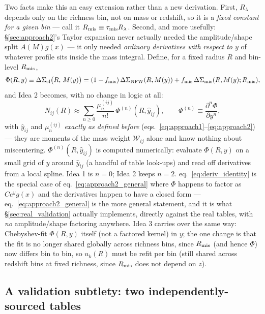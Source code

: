 \documentclass[a4paper, 11pt]{article}
\newcommand{\yeff}{\hat y}
\newcommand{\DSnfw}{\Delta\Sigma_{\rm NFW}}
\newcommand{\rmis}{R_{\rm mis}}
\newcommand{\Wcal}{\mathcal{W}}
\begin{document}
Two facts make this an easy extension rather than a new derivation.
First, $R_\lambda$ depends only on the richness bin, not on mass or
redshift, so it is a \emph{fixed constant for a given bin} --- call
it $\rmis \equiv \tau_{\rm mis}R_\lambda$. Second, and more usefully:
\S\ref{sec:approach2}'s Taylor expansion never actually needed the
amplitude/shape split $A(M)g(x)$ --- it only needed \emph{ordinary
derivatives with respect to $y$} of whatever profile sits inside the
mass integral. Define, for a fixed radius $R$ and bin-level $\rmis$,
\begin{equation}
\Phi(R,y) \equiv \Delta\Sigma_{\rm cl}\big(R,\,M(y)\big)
= (1-f_{\rm mis})\,\DSnfw(R,M(y)) + f_{\rm mis}\,\Delta\Sigma_{\rm mis}(R,M(y);\rmis),
\label{eq:Phi}
\end{equation}
and Idea 2 becomes, with no change in logic at all:
\begin{equation}
\boxed{\;
N_{ij}(R) \approx \sum_{n\ge0} \frac{\mu_n^{(ij)}}{n!}\,\Phi^{(n)}(R,\yeff_{ij}),
\qquad
\Phi^{(n)} \equiv \frac{\partial^n\Phi}{\partial y^n},
\;}
\label{eq:approach2_general}
\end{equation}
with $\yeff_{ij}$ and $\mu_n^{(ij)}$ \emph{exactly as defined before}
(eqs.~\ref{eq:approach1}--\ref{eq:approach2}) --- they are moments of
the mass weight $\Wcal_{ij}$ alone and know nothing about
miscentering. $\Phi^{(n)}(R,\yeff_{ij})$ is computed numerically:
evaluate $\Phi(R,y)$ on a small grid of $y$ around $\yeff_{ij}$ (a
handful of table look-ups) and read off derivatives from a local
spline. Idea 1 is $n=0$; Idea 2 keeps $n=2$. eq.~\eqref{eq:deriv_identity}
is the special case of eq.~\eqref{eq:approach2_general} where $\Phi$
happens to factor as $Ce^yg(x)$ and the derivatives happen to have a
closed form --- eq.~\eqref{eq:approach2_general} is the more general
statement, and it is what \S\ref{sec:real_validation} actually
implements, directly against the real tables, with \emph{no}
amplitude/shape factoring anywhere. Idea 3 carries over the same
way: Chebyshev-fit $\Phi(R,y)$ itself (not a factored kernel) in
$y$; the one change is that the fit is no longer shared globally
across richness bins, since $\rmis$ (and hence $\Phi$) now differs
bin to bin, so $u_k(R)$ must be refit per bin (still shared across
redshift bins at fixed richness, since $\rmis$ does not depend on
$z$).

\subsection{A validation subtlety: two independently-sourced tables}
\label{sec:mis_subtlety}
\end{document}
